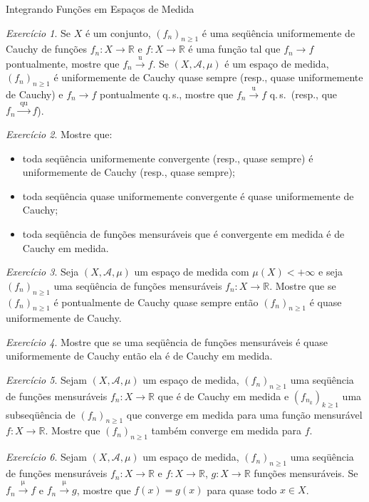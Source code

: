 \documentclass[oneside,final,11pt]{amsbook}
\newcommand{\R}{\mathds R}
\newcommand{\qs}{\hbox{q.$\,$s.}}
\newcommand{\To}[1]{\xrightarrow{\;\mathrm{#1}\;}}
\theoremstyle{remark}\newtheorem{exercise}{Exercício}[chapter]
\theoremstyle{remark}\newtheorem{*exercise}[exercise]{\hbox to 0pt{\hskip 0pt minus 1fil*}Exercício}
\theoremstyle{definition}\newtheorem{exdefin}{Definição}[chapter]
\theoremstyle{plain}\newtheorem{teo}{Teorema}[section]
\theoremstyle{plain}\newtheorem{lem}[teo]{Lema}
\theoremstyle{plain}\newtheorem{prop}[teo]{Proposição}
\theoremstyle{plain}\newtheorem{cor}[teo]{Corolário}
\theoremstyle{definition}\newtheorem{defin}[teo]{Definição}
\theoremstyle{remark}\newtheorem{rem}[teo]{Observação}
\theoremstyle{definition}\newtheorem{notation}[teo]{Notação}
\theoremstyle{definition}\newtheorem{convention}[teo]{Convenção}
\theoremstyle{definition}\newtheorem{example}[teo]{Exemplo}
\numberwithin{section}{chapter}
\numberwithin{equation}{section}
\begin{document}
\begin{chapter}{Integrando Funções em Espaços de Medida}
\begin{exercise}\label{exe:Cauchy3}
Se $X$ é um conjunto, $(f_n)_{n\ge1}$ é uma seqüência uniformemente de Cauchy de funções $f_n:X\to\R$
e $f:X\to\R$ é uma função tal que $f_n\to f$ pontualmente, mostre que $f_n\To uf$.
Se $(X,\mathcal A,\mu)$ é um espaço de medida, $(f_n)_{n\ge1}$ é uniformemente de Cauchy quase sempre
(resp., quase uniformemente de Cauchy) e $f_n\to f$ pontualmente \qs, mostre que
$f_n\To uf$ \qs\ (resp., que $f_n\To{qu}f$).
\end{exercise}

\begin{exercise}\label{exe:Cauchy4}
Mostre que:
\begin{itemize}
\item toda seqüência uniformemente convergente (resp., quase sempre) é uniformemente de Cauchy (resp., quase sempre);
\item toda seqüência quase uniformemente convergente é quase uniformemente de Cauchy;
\item toda seqüência de funções mensuráveis que é convergente em medida é de Cauchy em medida.
\end{itemize}
\end{exercise}

\begin{exercise}\label{exe:Cauchy5}
Seja $(X,\mathcal A,\mu)$ um espaço de medida com $\mu(X)<+\infty$ e seja $(f_n)_{n\ge1}$ uma seqüência
de funções mensuráveis $f_n:X\to\R$. Mostre que se $(f_n)_{n\ge1}$ é pontualmente de Cauchy quase sempre
então $(f_n)_{n\ge1}$ é quase uniformemente de Cauchy.
\end{exercise}

\begin{exercise}\label{exe:Cauchy6}
Mostre que se uma seqüência de funções mensuráveis é quase uniformemente de Cauchy então ela é de Cauchy em medida.
\end{exercise}

\begin{exercise}\label{exe:Cauchysubseq}
Sejam $(X,\mathcal A,\mu)$ um espaço de medida, $(f_n)_{n\ge1}$ uma seqüência de funções mensuráveis $f_n:X\to\R$
que é de Cauchy em medida e $(f_{n_k})_{k\ge1}$ uma subseqüência de $(f_n)_{n\ge1}$ que converge em medida
para uma função mensurável $f:X\to\R$. Mostre que $(f_n)_{n\ge1}$ também converge em medida para $f$.
\end{exercise}

\begin{exercise}
Sejam $(X,\mathcal A,\mu)$ um espaço de medida, $(f_n)_{n\ge1}$ uma seqüência de funções mensuráveis $f_n:X\to\R$
e $f:X\to\R$, $g:X\to\R$ funções mensuráveis. Se $f_n\To\mu f$ e $f_n\To\mu g$, mostre que $f(x)=g(x)$ para quase
todo $x\in X$.
\end{exercise}


\end{chapter}
\end{document}
